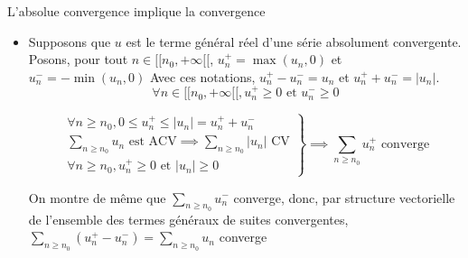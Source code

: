 \documentclass{article}
\renewenvironment{question_kholle}[2][ ]
{
	\subsection{\texorpdfstring{#2}{}}
	\notblank{#1}
	{
		\noindent #1
		\bigbreak
	}
	{}
	\begin{proof}
}
{
	\end{proof}
}
\begin{document}
\begin{question_kholle}[{Soit $u \in \K^{[ \! [ n_{0}, +\infty [ \![}$
  Si la série $\sum_{n\geqslant n_{0}}u_{n}$ est absolument convergente, alors la série $\sum_{n\geqslant n_{0}}u_{n}$ est convergente.}]{L'absolue convergence implique la convergence}



  \begin{itemize}[label=$\lozenge$]
    \item Supposons que $u$ est le terme général réel d'une série absolument convergente.
          Posons, pour tout $n \in [ \! [ n_{0}, +\infty [ \![$, $u_{n}^{+}= \max(u_{n}, 0)$ et $u_{n}^{-}=- \min (u_{n}, 0)$
          Avec ces notations, $u_{n}^{+}- u_{n}^{-} = u_{n}$ et $u_{n}^{+}+u_{n}^{-} = \lvert u_{n} \rvert$.
          $$
            \forall n \in [ \! [ n_{0}, +\infty [ \![, u_{n}^{+}\geqslant 0 \text{ et } u_{n}^{-}\geqslant 0
          $$

          $$
            \left. \begin{array}{ll}
              \forall n \geqslant n_{0}, 0\leqslant u_{n}^{+} \leqslant \lvert u_{n} \rvert = u_{n}^{+}+ u_{n}^{-}           \\
              \sum_{n\geqslant n_{0}} u_{n} \text{ est ACV} \implies \sum_{n\geqslant n_{0}} \lvert u_{n} \rvert  \text{ CV} \\
              \forall n \geqslant n_{0}, u_{n}^{+}\geqslant 0 \text{ et } \lvert u_{n} \rvert \geqslant 0
            \end{array}\right\}\implies \sum_{n\geqslant n_{0}}u_{n} ^{+}\text{ converge}
          $$

          On montre de même que $\sum_{n\geqslant n_{0}}u_{n}^{-}$ converge, donc, par structure vectorielle de l'ensemble des termes généraux de suites convergentes, $\sum_{ n\geqslant n_{0}}(u_{n}^{+} - u_{n}^{-})= \sum_{n\geqslant n_{0}}u_{n}$ converge
          \begin{figure}[H]
            \centering
\end{figure}
\end{itemize}
\end{question_kholle}
\end{document}
